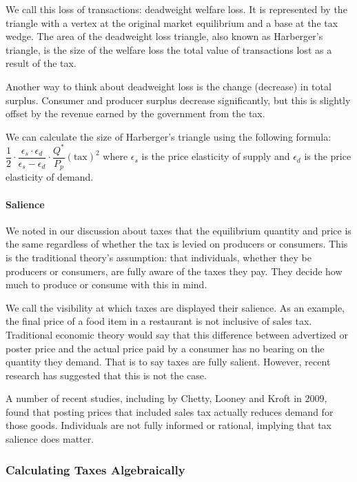 \documentclass[letterpaper,10pt,english]{jupyterBook}
\begin{document}
\sphinxAtStartPar
We call this loss of transactions: deadweight welfare loss. It is represented by the triangle with a vertex at the original market equilibrium and a base at the tax wedge. The area of the deadweight loss triangle, also known as Harberger’s triangle, is the size of the welfare loss \sphinxhyphen{} the total value of transactions lost as a result of the tax.

\sphinxAtStartPar
Another way to think about deadweight loss is the change (decrease) in total surplus. Consumer and producer surplus decrease significantly, but this is slightly offset by the revenue earned by the government from the tax.

\sphinxAtStartPar
We can calculate the size of Harberger’s triangle using the following formula: \(\dfrac{1}{2} \cdot \dfrac{\epsilon_s \cdot \epsilon_d}{\epsilon_s - \epsilon_d} \cdot \dfrac{Q^*}{P_p} (\text{tax})^2\) where \(\epsilon_s\) is the price elasticity of supply and  \(\epsilon_d\) is the price elasticity of demand.


\paragraph{Salience}
\label{\detokenize{content/03-public/taxes-subsidies:salience}}
\sphinxAtStartPar
We noted in our discussion about taxes that the equilibrium quantity and price is the same regardless of whether the tax is levied on producers or consumers. This is the traditional theory’s assumption: that individuals, whether they be producers or consumers, are fully aware of the taxes they pay. They decide how much to produce or consume with this in mind.

\sphinxAtStartPar
We call the visibility at which taxes are displayed their salience. As an example, the final price of a food item in a restaurant is not inclusive of sales tax. Traditional economic theory would say that this difference between advertized or poster price and the actual price paid by a consumer has no bearing on the quantity they demand. That is to say taxes are fully salient. However, recent research has suggested that this is not the case.

\sphinxAtStartPar
A number of recent studies, including by Chetty, Looney and Kroft in 2009, found that posting prices that included sales tax actually reduces demand for those goods. Individuals are not fully informed or rational, implying that tax salience does matter.


\subsubsection{Calculating Taxes Algebraically}
\label{\detokenize{content/03-public/taxes-subsidies:calculating-taxes-algebraically}}
\end{document}
